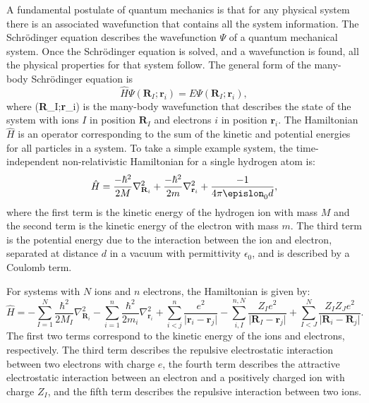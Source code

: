 A fundamental postulate of quantum mechanics is that for any physical system there is an associated wavefunction that contains all the system information.
The Schr\"{o}dinger equation describes the wavefunction $\Psi$ of a quantum mechanical system.  Once the Schr\"{o}dinger equation is solved, and a wavefunction is found, all the physical properties for that system follow. 
The general form of the many-body Schr\"{o}dinger equation is
\begin{equation}
\hat{H}\Psi(\textbf{R}_I;\textbf{r}_i) = E\Psi(\textbf{R}_I;\textbf{r}_i),
\end{equation}
where \Psi(\textbf{R}_I;\textbf{r}_i) is the many-body wavefunction that describes the state of the system with ions $I$ in position $\textbf{R}_I$ and electrons $i$ in position $\textbf{r}_i$.
The Hamiltonian $\hat{H}$ is an operator corresponding to the sum of the kinetic and potential energies for all particles in a system. To take a simple example system, the time-independent non-relativistic Hamiltonian for a single hydrogen atom is:
\begin{equation} \label{singleparticle}
\hat{H} = \frac{-\hbar^2}{2M}\nabla_{\textbf{R}_i}^2+\frac{-\hbar^2}{2m}\nabla_{\textbf{r}_i}^2+\frac{-1}{4\pi\epislon_0d},
\end{equation}
where the first term is the kinetic energy of the hydrogen ion with mass $M$ and the second term is the kinetic energy of the electron with mass $m$. The third term is the potential energy due to the interaction between the ion and electron, separated at distance $d$ in a vacuum with permittivity $\epsilon_0$, and is described by a Coulomb term. 

For systems with $N$ ions and $n$ electrons, the Hamiltonian is given by:
\begin{equation} \label{manybodyH}
\hat{H} = -\sum_{I=1}^N\frac{\hbar^2}{2M_I}\nabla_{\textbf{R}_i}^2-\sum_{i=1}^n\frac{\hbar^2}{2m_i}\nabla_{\textbf{r}_i}^2 +\sum_{i<j}^n\frac{e^2}{\lvert\textbf{r}_i-\textbf{r}_j\rvert}-\sum_{i,I}^{n,N}\frac{Z_Ie^2}{\lvert\textbf{R}_I-\textbf{r}_j\rvert}+\sum_{I<J}^N\frac{Z_IZ_Je^2}{\lvert\textbf{R}_i-\textbf{R}_j\rvert}.
\end{equation}
The first two terms correspond to the kinetic energy of the ions and electrons, respectively. The third term describes the repulsive electrostatic interaction between two electrons with charge $e$, the fourth term describes the attractive electrostatic interaction between an electron and a positively charged ion with charge $Z_I$, and the fifth term describes the repulsive interaction between two ions.

